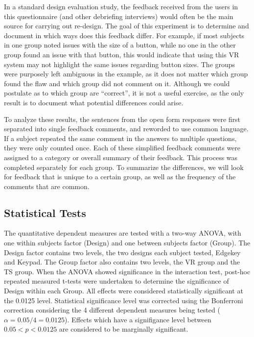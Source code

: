 In a standard design evaluation study, the feedback received from the users in this questionnaire (and other debriefing interviews) would often be the main source for carrying out re-design.
The goal of this experiment is to determine and document in which ways does this feedback differ.
For example, if most subjects in one group noted issues with the size of a button, while no one in the other group found an issue with that button, this would indicate that using this VR system may not highlight the same issues regarding button sizes.
The groups were purposely left ambiguous in the example, as it does not matter which group found the flaw and which group did not comment on it.
Although we could postulate as to which group are ``correct'', it is not a useful exercise, as the only result is to document what potential differences could arise.

To analyze these results, the sentences from the open form responses were first separated into single feedback comments, and reworded to use common language.
If a subject repeated the same comment in the answers to multiple questions, they were only counted once.
Each of these simplified feedback comments were assigned to a category or overall summary of their feedback.
This process was completed separately for each group.
To summarize the differences, we will look for feedback that is unique to a certain group, as well as the frequency of the comments that are common.

\subsection{Statistical Tests}

The quantitative dependent measures are tested with a two-way ANOVA, with one within subjects factor (Design) and one between subjects factor (Group).
The Design factor contains two levels, the two designs each subject tested, Edgekey and Keypad.
The Group factor also contains two levels, the VR group and the TS group.
When the ANOVA showed significance in the interaction test, post-hoc repeated measured t-tests were undertaken to determine the significance of Design within each Group.
All effects were considered statistically significant at the 0.0125 level.
Statistical significance level was corrected using the Bonferroni correction considering the 4 different dependent measures being tested ($\alpha = 0.05/4 = 0.0125$).
Effects which have a signifigance level between $0.05<p<0.0125$ are considered to be marginally significant.

